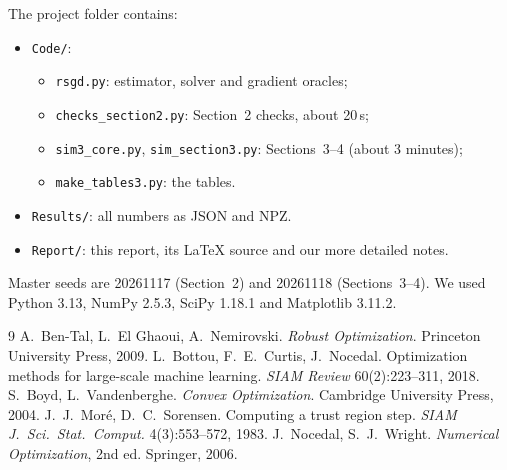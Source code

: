 \documentclass[11pt,a4paper]{article}
\begin{document}
The project folder contains:
\begin{itemize}
\item \texttt{Code/}:
  \begin{itemize}
  \item \texttt{rsgd.py}: estimator, solver and gradient oracles;
  \item \texttt{checks\_section2.py}: Section~2 checks, about 20\,s;
  \item \texttt{sim3\_core.py}, \texttt{sim\_section3.py}: Sections~3--4 (about 3 minutes);
  \item \texttt{make\_tables3.py}: the tables.
  \end{itemize}
\item \texttt{Results/}: all numbers as JSON and NPZ.
\item \texttt{Report/}: this report, its LaTeX source and our more detailed notes.
\end{itemize}
Master seeds are 20261117 (Section~2) and 20261118 (Sections~3--4). We used Python 3.13, NumPy 2.5.3,
SciPy 1.18.1 and Matplotlib 3.11.2.

\begin{thebibliography}{9}
\small
{} A.~Ben-Tal, L.~El Ghaoui, A.~Nemirovski. \emph{Robust Optimization}. Princeton
University Press, 2009.
 L.~Bottou, F.~E.~Curtis, J.~Nocedal. Optimization methods for large-scale machine
learning. \emph{SIAM Review} 60(2):223--311, 2018.
 S.~Boyd, L.~Vandenberghe. \emph{Convex Optimization}. Cambridge University Press, 2004.
 J.~J.~Moré, D.~C.~Sorensen. Computing a trust region step. \emph{SIAM J.\ Sci.\ Stat.\
Comput.} 4(3):553--572, 1983.
 J.~Nocedal, S.~J.~Wright. \emph{Numerical Optimization}, 2nd ed. Springer, 2006.
\end{thebibliography}
\end{document}
